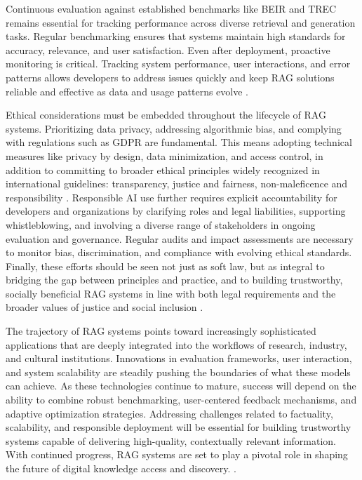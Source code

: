 \begin{spacing}{1.5}
Continuous evaluation against established benchmarks like BEIR \citep{thakur_beir_2021} and TREC \citep{voorhees_trec_2005} remains essential for tracking performance across diverse retrieval and generation tasks. Regular benchmarking ensures that systems maintain high standards for accuracy, relevance, and user satisfaction. Even after deployment, proactive monitoring is critical. Tracking system performance, user interactions, and error patterns allows developers to address issues quickly and keep RAG solutions reliable and effective as data and usage patterns evolve \citep{amershi_software_2019}.

Ethical considerations must be embedded throughout the lifecycle of RAG systems. Prioritizing data privacy, addressing algorithmic bias, and complying with regulations such as GDPR are fundamental. This means adopting technical measures like privacy by design, data minimization, and access control, in addition to committing to broader ethical principles widely recognized in international guidelines: transparency, justice and fairness, non-maleficence and responsibility \citep{jobin_global_2019}. Responsible AI use further requires explicit accountability for developers and organizations by clarifying roles and legal liabilities, supporting whistleblowing, and involving a diverse range of stakeholders in ongoing evaluation and governance. Regular audits and impact assessments are necessary to monitor bias, discrimination, and compliance with evolving ethical standards. Finally, these efforts should be seen not just as soft law, but as integral to bridging the gap between principles and practice, and to building trustworthy, socially beneficial RAG systems in line with both legal requirements and the broader values of justice and social inclusion \citep{ashery_emergent_2025}.

The trajectory of RAG systems points toward increasingly sophisticated applications that are deeply integrated into the workflows of research, industry, and cultural institutions. Innovations in evaluation frameworks, user interaction, and system scalability are steadily pushing the boundaries of what these models can achieve. As these technologies continue to mature, success will depend on the ability to combine robust benchmarking, user-centered feedback mechanisms, and adaptive optimization strategies. Addressing challenges related to factuality, scalability, and responsible deployment will be essential for building trustworthy systems capable of delivering high-quality, contextually relevant information. With continued progress, RAG systems are set to play a pivotal role in shaping the future of digital knowledge access and discovery. \parencite{wang_searching_2024, gao_retrieval-augmented_2024}.


\end{spacing}
